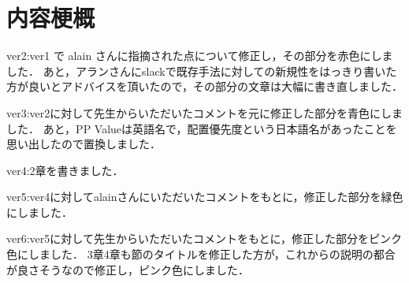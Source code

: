 \chapter*{内容梗概}
ver2:ver1 で alain さんに指摘された点について修正し，その部分を赤色にしました．
あと，アランさんにslackで既存手法に対しての新規性をはっきり書いた方が良いとアドバイスを頂いたので，その部分の文章は大幅に書き直しました．

ver3:ver2に対して先生からいただいたコメントを元に修正した部分を青色にしました．
あと，PP Valueは英語名で，配置優先度という日本語名があったことを思い出したので置換しました．

ver4:2章を書きました．

ver5:ver4に対してalainさんにいただいたコメントをもとに，修正した部分を緑色にしました．

ver6:ver5に対して先生からいただいたコメントをもとに，修正した部分をピンク色にしました．
    3章4章も節のタイトルを修正した方が，これからの説明の都合が良さそうなので修正し，ピンク色にしました．

